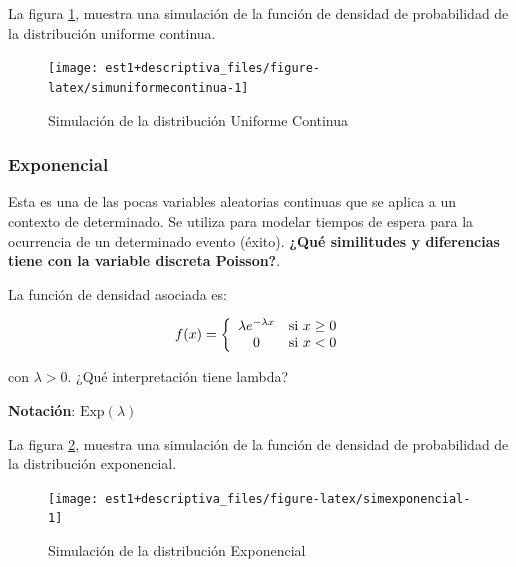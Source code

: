 \documentclass[
  11pt,
]{book}
\theoremstyle{definition}
\theoremstyle{definition}
\theoremstyle{definition}
\theoremstyle{definition}
\theoremstyle{remark}
\begin{document}
La figura \ref{fig:simuniformecontinua}, muestra una simulación de la función de densidad de probabilidad de la distribución uniforme continua.

\begin{figure}

{\centering \texttt{[image: est1+descriptiva\_files/figure-latex/simuniformecontinua-1]} 

}

\caption{Simulación de la distribución Uniforme Continua}\label{fig:simuniformecontinua}
\end{figure}

\subsubsection{Exponencial}\label{exponencial}

Esta es una de las pocas variables aleatorias continuas que se aplica a un contexto de determinado. Se utiliza para modelar tiempos de espera para la ocurrencia de un determinado evento (éxito). \textbf{¿Qué similitudes y diferencias tiene con la variable discreta Poisson?}.

La función de densidad asociada es:

\begin{equation}
\notag
f(x)= \left\lbrace
\begin{array}{cl}
\lambda e^{ -\lambda x} & \text{si } x \geq 0\\
0 & \text{si } x < 0
\end{array}
\right.
\end{equation}

con \(\lambda > 0\). ¿Qué interpretación tiene lambda?

\textbf{Notación}: \(\text{Exp}(\lambda)\)

La figura \ref{fig:simexponencial}, muestra una simulación de la función de densidad de probabilidad de la distribución exponencial.

\begin{figure}

{\centering \texttt{[image: est1+descriptiva\_files/figure-latex/simexponencial-1]} 

}

\caption{Simulación de la distribución Exponencial}\label{fig:simexponencial}
\end{figure}
\end{document}
